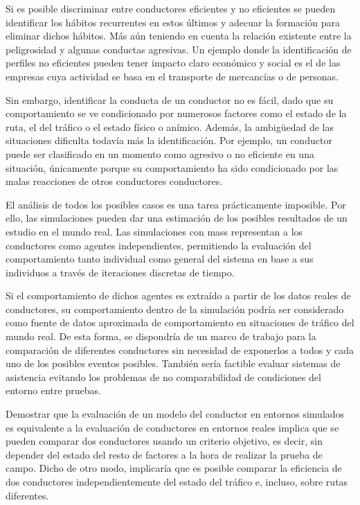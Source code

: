 Si es posible discriminar entre conductores eficientes y no eficientes se pueden identificar los hábitos recurrentes en estos últimos y adecuar la formación para eliminar dichos hábitos. Más aún teniendo en cuenta la relación existente entre la peligrosidad y algunas conductas agresivas. Un ejemplo donde la identificación de perfiles no eficientes pueden tener impacto claro económico y social es el de las empresas cuya actividad se basa en el transporte de mercancías o de personas.

Sin embargo, identificar la conducta de un conductor no es fácil, dado que su comportamiento se ve condicionado por numerosos factores como el estado de la ruta, el del tráfico o el estado físico o anímico. Además, la ambigüedad de las situaciones dificulta todavía más la identificación. Por ejemplo, un conductor puede ser clasificado en un momento como agresivo o no eficiente en una situación, únicamente porque su comportamiento ha sido condicionado por las malas reacciones de otros conductores conductores.

El análisis de todos los posibles casos es una tarea prácticamente imposible. Por ello, las simulaciones pueden dar una estimación de los posibles resultados de un estudio en el mundo real. Las simulaciones con \acp{mas} representan a los conductores como agentes independientes, permitiendo la evaluación del comportamiento tanto individual como general del sistema en base a sus individuos a través de iteraciones discretas de tiempo.

Si el comportamiento de dichos agentes es extraído a partir de los datos reales de conductores, su comportamiento dentro de la simulación podría ser considerado como fuente de datos aproximada de comportamiento en situaciones de tráfico del mundo real. De esta forma, se dispondría de un marco de trabajo para la comparación de diferentes conductores sin necesidad de exponerlos a todos y cada uno de los posibles eventos posibles. También sería factible evaluar sistemas de asistencia evitando los problemas de no comparabilidad de condiciones del entorno entre pruebas.

Demostrar que la evaluación de un modelo del conductor en entornos simulados es equivalente a la evaluación de conductores en entornos reales implica que se pueden comparar dos conductores usando un criterio objetivo, es decir, sin depender del estado del resto de factores a la hora de realizar la prueba de campo. Dicho de otro modo, implicaría que es posible comparar la eficiencia de dos conductores independientemente del estado del tráfico e, incluso, sobre rutas diferentes.

